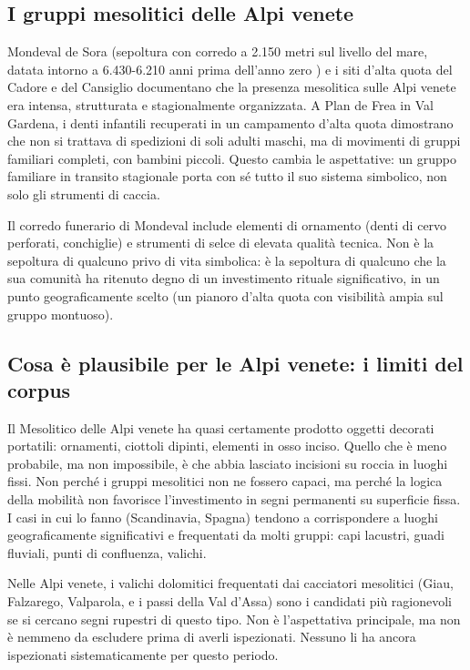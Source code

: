\subsection{I gruppi mesolitici delle Alpi venete}

Mondeval de Sora (sepoltura con corredo a 2.150 metri sul livello del mare, datata intorno a 6.430-6.210 anni prima dell'anno zero \citep{fontana2020}) e i siti d'alta quota del Cadore e del Cansiglio documentano che la presenza mesolitica sulle Alpi venete era intensa, strutturata e stagionalmente organizzata. A Plan de Frea in Val Gardena, i denti infantili recuperati in un campamento d'alta quota dimostrano che non si trattava di spedizioni di soli adulti maschi, ma di movimenti di gruppi familiari completi, con bambini piccoli. Questo cambia le aspettative: un gruppo familiare in transito stagionale porta con sé tutto il suo sistema simbolico, non solo gli strumenti di caccia.

Il corredo funerario di Mondeval include elementi di ornamento (denti di cervo perforati, conchiglie) e strumenti di selce di elevata qualità tecnica. Non è la sepoltura di qualcuno privo di vita simbolica: è la sepoltura di qualcuno che la sua comunità ha ritenuto degno di un investimento rituale significativo, in un punto geograficamente scelto (un pianoro d'alta quota con visibilità ampia sul gruppo montuoso).

\subsection{Cosa è plausibile per le Alpi venete: i limiti del corpus}

Il Mesolitico delle Alpi venete ha quasi certamente prodotto oggetti decorati portatili: ornamenti, ciottoli dipinti, elementi in osso inciso. Quello che è meno probabile, ma non impossibile, è che abbia lasciato incisioni su roccia in luoghi fissi. Non perché i gruppi mesolitici non ne fossero capaci, ma perché la logica della mobilità non favorisce l'investimento in segni permanenti su superficie fissa. I casi in cui lo fanno (Scandinavia, Spagna) tendono a corrispondere a luoghi geograficamente significativi e frequentati da molti gruppi: capi lacustri, guadi fluviali, punti di confluenza, valichi.

Nelle Alpi venete, i valichi dolomitici frequentati dai cacciatori mesolitici (Giau, Falzarego, Valparola, e i passi della Val d'Assa) sono i candidati più ragionevoli se si cercano segni rupestri di questo tipo. Non è l'aspettativa principale, ma non è nemmeno da escludere prima di averli ispezionati. Nessuno li ha ancora ispezionati sistematicamente per questo periodo.

